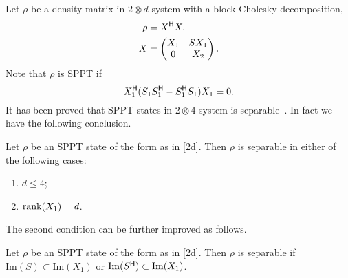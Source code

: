   Let $\rho$ be a density matrix in $2\otimes d$ system with a block Cholesky decomposition,
  \begin{equation}
    \label{2d}
    \begin{split}
      \rho &= X^{\mathsf{H}}X,\\
      X &=
      \begin{pmatrix}
        X_1 & S X_1\\
        0 & X_2
      \end{pmatrix}.
    \end{split}
  \end{equation}
  Note that $\rho$ is SPPT if
  \begin{equation}
    \label{multiSPPTv0.6:eq:9}
    X^{\mathsf{H}}_1 (S_1S^{\mathsf{H}}_1-S^{\mathsf{H}}_1 S_1) X_1 = 0.
  \end{equation}
  It has been proved that SPPT states in $2\otimes 4$ system is separable~\cite{ha2013separability}. In fact we have the following conclusion.
  \begin{lem}\label{lem:2} Let $\rho$ be an SPPT state of the form as in \cref{2d}. Then 
    $\rho$ is separable in either of the following cases:
    \begin{enumerate}
      \item $d \leqslant 4$;
      \item $\mathrm{rank} (X_1) = d$.
    \end{enumerate}
  \end{lem}
  The second condition can be further improved as follows. 
  \begin{lem}
    Let $\rho$ be an SPPT state of the form as in \cref{2d}. Then $\rho$ is separable if $\mathrm{Im}(S)\subset \mathrm{Im}(X_1)$
    or $\mathrm{Im}(S^{\mathsf{H}})\subset \mathrm{Im}(X_1)$.
  \end{lem}
